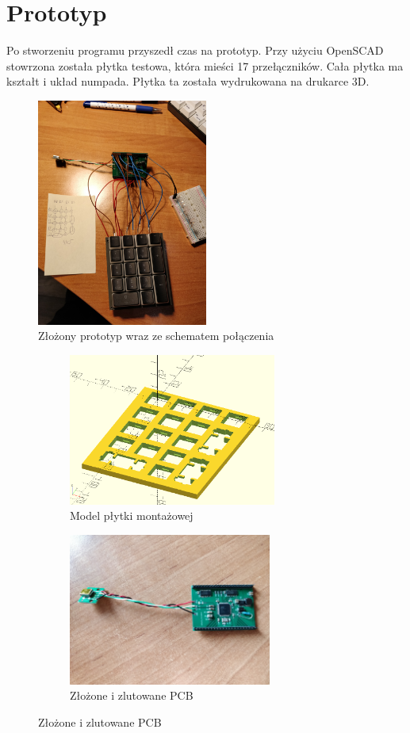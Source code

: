 \documentclass{article}
\begin{document}
    \section{Prototyp}
    Po stworzeniu programu przyszedł czas na prototyp. Przy użyciu OpenSCAD stowrzona została płytka testowa, która mieści 17 przełączników.
    Cała płytka ma kształt i układ numpada. Płytka ta została wydrukowana na drukarce 3D.
    \begin{figure}[h]
        \centering
        \includegraphics[width=0.5\textwidth]{proto.jpg} 
        \caption{Złożony prototyp wraz ze schematem połączenia}
        \end{figure}
    \newpage
    \begin{figure}[h]
        \centering
        \begin{subfigure}{0.45\textwidth}
            \centering
        \includegraphics[height=5cm]{plate.png} 
        \caption{Model płytki montażowej}
        \label{fig:subim1}
        \end{subfigure}
        \begin{subfigure}{0.45\textwidth}
            \centering
            \includegraphics[height=5cm]{pcb_2.jpg}
            \caption{Złożone i zlutowane PCB}
            \label{fig:subim2}
        \end{subfigure}
        \end{figure}
\end{document}
